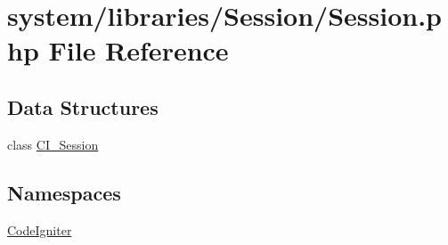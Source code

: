 \hypertarget{_session_8php}{}\section{system/libraries/\+Session/\+Session.php File Reference}
\label{_session_8php}
\subsection*{Data Structures}
\begin{DoxyCompactItemize}
\item 
class \mbox{\hyperlink{class_c_i___session}{C\+I\+\_\+\+Session}}
\end{DoxyCompactItemize}
\subsection*{Namespaces}
\begin{DoxyCompactItemize}
\item 
 \mbox{\hyperlink{namespace_code_igniter}{Code\+Igniter}}
\end{DoxyCompactItemize}
